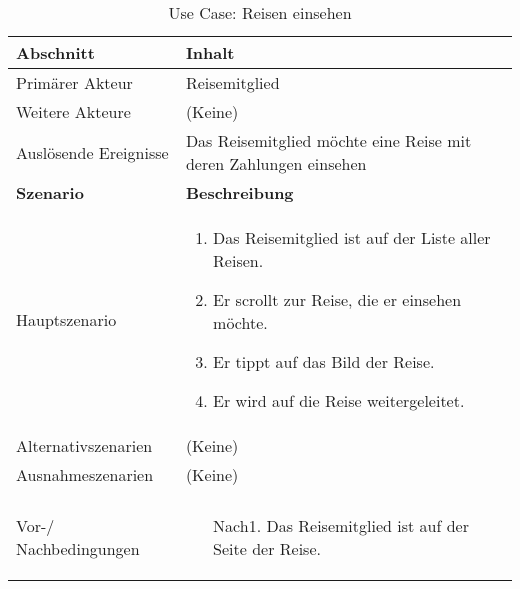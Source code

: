\begin{table}[H]
	\footnotesize
	\caption{Use Case: Reisen einsehen}
	\begin{tabularx}{0.95\textwidth}{ |l|X| }
		\hline
		\rowcolor{gray} \textbf{Abschnitt}     & \textbf{Inhalt}                                                  \\
		\hline
		Primärer Akteur                        & Reisemitglied                                                    \\
		\hline
		Weitere Akteure                        & (Keine)                                                          \\
		\hline
		Auslösende Ereignisse                  & Das Reisemitglied möchte eine Reise mit deren Zahlungen einsehen \\

		\hline
		\rowcolor{lightgray} \textbf{Szenario} & \textbf{Beschreibung}                                            \\
		\hline
		Hauptszenario                          & \begin{enumerate}
			                                         \item Das Reisemitglied ist auf der Liste aller Reisen.
			                                         \item Er scrollt zur Reise, die er einsehen möchte.
			                                         \item Er tippt auf das Bild der Reise.
			                                         \item Er wird auf die Reise weitergeleitet.
		                                         \end{enumerate}           \\
		\hline
		Alternativszenarien                    & (Keine)                                                          \\
		\hline
		Ausnahmeszenarien                      & (Keine)                                                          \\
		\hline
		\rowcolor{lightgray}                   &                                                                  \\
		\hline
		Vor-/ Nachbedingungen                  & \begin{enumerate}
			                                         \item[Nach1.] Das Reisemitglied ist auf der Seite der Reise.
		                                         \end{enumerate}      \\
		\hline
	\end{tabularx}
\end{table}

